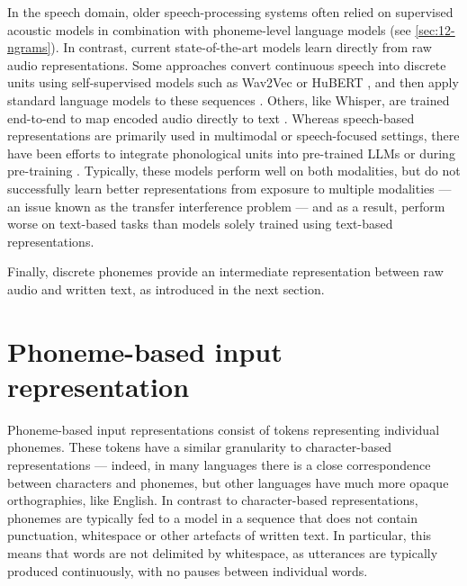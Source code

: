 In the speech domain, older speech-processing systems often relied on supervised acoustic models in combination with phoneme-level language models (see \cref{sec:12-ngrams}). In contrast, current state-of-the-art models learn directly from raw audio representations. Some approaches convert continuous speech into discrete units using self-supervised models such as Wav2Vec \citep{baevski2020wav2vec} or HuBERT \citep{hsu-2021-hubert}, and then apply standard language models to these sequences \citep{lakhotia2021generative}. Others, like Whisper, are trained end-to-end to map encoded audio directly to text \citep{radford2023robust}. Whereas speech-based representations are primarily used in multimodal or speech-focused settings, there have been efforts to integrate phonological units into pre-trained LLMs \citep{nguyen-etal-2025-spirit} or during pre-training \citep{bapna2021slam}. Typically, these models perform well on both modalities, but do not successfully learn better representations from exposure to multiple modalities --- an issue known as the transfer interference problem \citep{arivazhagan2019massively} --- and as a result, perform worse on text-based tasks than models solely trained using text-based representations. 

Finally, discrete phonemes provide an intermediate representation between raw audio and written text, as introduced in the next section. %


\section{Phoneme-based input representation}\label{sec:12-phonemic}

Phoneme-based input representations consist of tokens representing individual phonemes. These tokens have a similar granularity to character-based representations --- indeed, in many languages there is a close correspondence between characters and phonemes, but other languages have much more opaque orthographies, like English. In contrast to character-based representations, phonemes are typically fed to a model in a sequence that does not contain punctuation, whitespace or other artefacts of written text. In particular, this means that words are not delimited by whitespace, as utterances are typically produced continuously, with no pauses between individual words.

